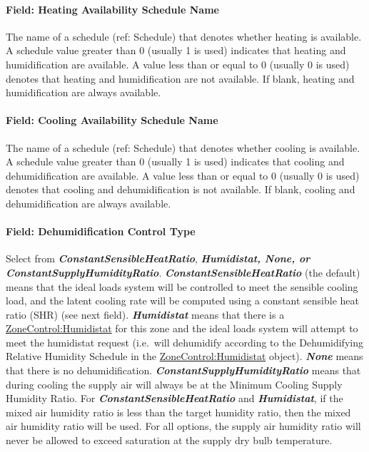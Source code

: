 \paragraph{Field: Heating Availability Schedule Name}\label{field-heating-availability-schedule-name-001}

The name of a schedule (ref: Schedule) that denotes whether heating is available. A schedule value greater than 0 (usually 1 is used) indicates that heating and humidification are available. A value less than or equal to 0 (usually 0 is used) denotes that heating and humidification are not available. If blank, heating and humidification are always available.

\paragraph{Field: Cooling Availability Schedule Name}\label{field-cooling-availability-schedule-name-001}

The name of a schedule (ref: Schedule) that denotes whether cooling is available. A schedule value greater than 0 (usually 1 is used) indicates that cooling and dehumidification are available. A value less than or equal to 0 (usually 0 is used) denotes that cooling and dehumidification is not available. If blank, cooling and dehumidification are always available.

\paragraph{Field: Dehumidification Control Type}\label{field-dehumidification-control-type-002}

Select from \textbf{\emph{ConstantSensibleHeatRatio}}, \textbf{\emph{Humidistat, None, or ConstantSupplyHumidityRatio}}. \textbf{\emph{ConstantSensibleHeatRatio}} (the default) means that the ideal loads system will be controlled to meet the sensible cooling load, and the latent cooling rate will be computed using a constant sensible heat ratio (SHR) (see next field). \textbf{\emph{Humidistat}} means that there is a \hyperref[zonecontrolhumidistat]{ZoneControl:Humidistat} for this zone and the ideal loads system will attempt to meet the humidistat request (i.e.~will dehumidify according to the Dehumidifying Relative Humidity Schedule in the \hyperref[zonecontrolhumidistat]{ZoneControl:Humidistat} object). \textbf{\emph{None}} means that there is no dehumidification. \textbf{\emph{ConstantSupplyHumidityRatio}} means that during cooling the supply air will always be at the Minimum Cooling Supply Humidity Ratio. For \textbf{\emph{ConstantSensibleHeatRatio}} and \textbf{\emph{Humidistat}}, if the mixed air humidity ratio is less than the target humidity ratio, then the mixed air humidity ratio will be used. For all options, the supply air humidity ratio will never be allowed to exceed saturation at the supply dry bulb temperature.

